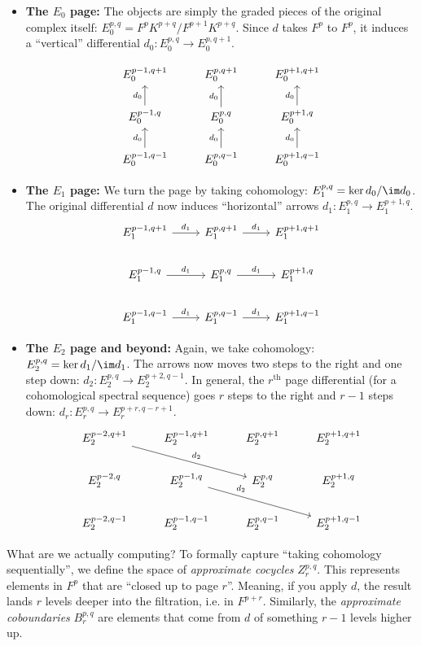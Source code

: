 \begin{itemize}

\item \textbf{The $E_0$ page:} The objects are simply the graded pieces of the original complex itself: $E_0^{p,q} = F^pK^{p+q}/F^{p+1}K^{p+q}$. Since $d$ takes $F^p$ to $F^p$, it induces a ``vertical'' differential $d_0: E_0^{p,q} \to E_0^{p,q+1}$.

\[\begin{tikzcd}
E_0^{p-1, q+1} & E_0^{p, q+1} & E_0^{p+1, q+1} \\
E_0^{p-1, q} \arrow[u, "d_0"] & E_0^{p, q} \arrow[u, "d_0"] & E_0^{p+1, q} \arrow[u, "d_0"] \\
E_0^{p-1, q-1} \arrow[u, "d_0"] & E_0^{p, q-1} \arrow[u, "d_0"] & E_0^{p+1, q-1} \arrow[u, "d_0"]
\end{tikzcd}\]

\item \textbf{The $E_1$ page:} We turn the page by taking cohomology: $E_1^{p,q} = \ker d_0 / \im d_0$. The original differential $d$ now induces ``horizontal'' arrows $d_1: E_1^{p,q} \to E_1^{p+1, q}$. 
\[\begin{tikzcd}
E_1^{p-1, q+1} \arrow[r, "d_1"] & E_1^{p, q+1} \arrow[r, "d_1"] & E_1^{p+1, q+1} \\
E_1^{p-1, q} \arrow[r, "d_1"] & E_1^{p, q} \arrow[r, "d_1"] & E_1^{p+1, q} \\
E_1^{p-1, q-1} \arrow[r, "d_1"] & E_1^{p, q-1} \arrow[r, "d_1"] & E_1^{p+1, q-1}
\end{tikzcd}\]

\item \textbf{The $E_2$ page and beyond:} Again, we take cohomology: $E_2^{p,q} = \ker d_1 / \im d_1$. The arrows now moves two steps to the right and one step down: $d_2: E_2^{p,q} \to E_2^{p+2, q-1}$. In general, the $r^\text{th}$ page differential (for a cohomological spectral sequence) goes $r$ steps to the right and $r-1$ steps down: $d_r: E_r^{p,q} \to E_r^{p+r, q-r+1}$.
\[\begin{tikzcd}
E_2^{p-2, q+1} \arrow[drr, "d_2"] & E_2^{p-1, q+1} & E_2^{p, q+1} & E_2^{p+1, q+1} \\
E_2^{p-2, q} & E_2^{p-1, q} \arrow[drr, "d_2" near start] & E_2^{p, q} & E_2^{p+1, q} \\
E_2^{p-2, q-1} & E_2^{p-1, q-1} & E_2^{p, q-1} & E_2^{p+1, q-1}
\end{tikzcd}\]
\end{itemize}

\noindent What are we actually computing? To formally capture ``taking cohomology sequentially'', we define the space of \emph{approximate cocycles} $Z_r^{p,q}$. This represents elements in $F^p$ that are ``closed up to page $r$''. Meaning, if you apply $d$, the result lands $r$ levels deeper into the filtration, i.e. in $F^{p+r}$. Similarly, the \emph{approximate coboundaries} $B_r^{p,q}$ are elements that come from $d$ of something $r-1$ levels higher up.

